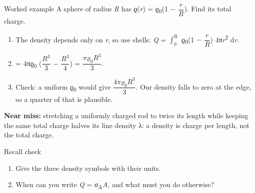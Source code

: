 \documentclass[11pt]{article}
\begin{document}
\begin{keepsection}
\begin{workedbox}{Worked example}
A sphere of radius \textit{R} has ϱ(\textit{r}) = ϱ\textsubscript{0}(1 \ensuremath{-} {\small\ensuremath{\dfrac{{r}}{{R}}}}). Find its total charge.

\begin{enumerate}
\item The density depends only on \textit{r}, so use shells: \textit{Q} = $\int_{0}^{\mathrm{R}} $ ϱ\textsubscript{0}(1 \ensuremath{-} {\small\ensuremath{\dfrac{{r}}{{R}}}}) 4π\textit{r}\textsuperscript{2} d\textit{r}.
\item = 4πϱ\textsubscript{0} ({\small\ensuremath{\dfrac{{R}^{3}}{3}}} \ensuremath{-} {\small\ensuremath{\dfrac{{R}^{3}}{4}}}) = {\small\ensuremath{\dfrac{πϱ_{0}{R}^{3}}{3}}}.
\item Check: a uniform ϱ\textsubscript{0} would give {\small\ensuremath{\dfrac{4πϱ_{0}{R}^{3}}{3}}}. Our density falls to zero at the edge, so a quarter of that is plausible.
\end{enumerate}
\end{workedbox}

\begin{notebox}\textbf{Near miss:} stretching a uniformly charged rod to twice its length while keeping the same total charge halves its line density λ: a density is charge per length, not the total charge.\end{notebox}

\begin{recallbox}{Recall check}
\begin{enumerate}
\item Give the three density symbols with their units.
\item When can you write \textit{Q} = σ\textsubscript{A}\textit{A}, and what must you do otherwise?
\end{enumerate}

\end{recallbox}
\end{keepsection}
\end{document}
